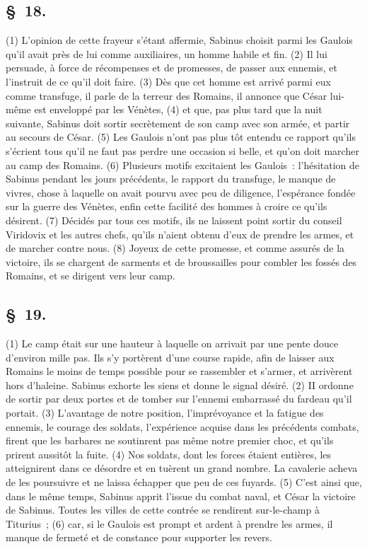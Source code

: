 \documentclass[french,twoside]{book} %
\begin{document}
\subsection[{§ 18.}]{ \textsc{§ 18.} }
\noindent (1) L'opinion de cette frayeur s’étant affermie, Sabinus choisit parmi les Gaulois qu’il avait près de lui comme auxiliaires, un homme habile et fin. (2) Il lui persuade, à force de récompenses et de promesses, de passer aux ennemis, et l’instruit de ce qu’il doit faire. (3) Dès que cet homme est arrivé parmi eux comme transfuge, il parle de la terreur des Romains, il annonce que César lui-même est enveloppé par les Vénètes, (4) et que, pas plus tard que la nuit suivante, Sabinus doit sortir secrètement de son camp avec son armée, et partir au secours de César. (5) Les Gaulois n’ont pas plus tôt entendu ce rapport qu’ils s’écrient tous qu’il ne faut pas perdre une occasion si belle, et qu’on doit marcher au camp des Romains. (6) Plusieurs motifs excitaient les Gaulois : l’hésitation de Sabinus pendant les jours précédents, le rapport du transfuge, le manque de vivres, chose à laquelle on avait pourvu avec peu de diligence, l’espérance fondée sur la guerre des Vénètes, enfin cette facilité des hommes à croire ce qu’ils désirent. (7) Décidés par tous ces motifs, ils ne laissent point sortir du conseil Viridovix et les autres chefs, qu’ils n’aient obtenu d’eux de prendre les armes, et de marcher contre nous. (8) Joyeux de cette promesse, et comme assurés de la victoire, ils se chargent de sarments et de broussailles pour combler les fossés des Romains, et se dirigent vers leur camp.
\subsection[{§ 19.}]{ \textsc{§ 19.} }
\noindent (1) Le camp était sur une hauteur à laquelle on arrivait par une pente douce d’environ mille pas. Ils s’y portèrent d’une course rapide, afin de laisser aux Romains le moins de temps possible pour se rassembler et s’armer, et arrivèrent hors d’haleine. Sabinus exhorte les siens et donne le signal désiré. (2) II ordonne de sortir par deux portes et de tomber sur l’ennemi embarrassé du fardeau qu’il portait. (3) L'avantage de notre position, l’imprévoyance et la fatigue des ennemis, le courage des soldats, l’expérience acquise dans les précédents combats, firent que les barbares ne soutinrent pas même notre premier choc, et qu’ils prirent aussitôt la fuite. (4) Nos soldats, dont les forces étaient entières, les atteignirent dans ce désordre et en tuèrent un grand nombre. La cavalerie acheva de les poursuivre et ne laissa échapper que peu de ces fuyards. (5) C'est ainsi que, dans le même temps, Sabinus apprit l’issue du combat naval, et César la victoire de Sabinus. Toutes les villes de cette contrée se rendirent sur-le-champ à Titurius ; (6) car, si le Gaulois est prompt et ardent à prendre les armes, il manque de fermeté et de constance pour supporter les revers.
\end{document}
